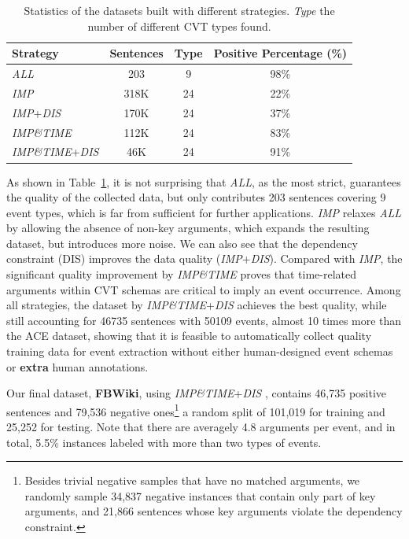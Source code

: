 \begin{table}[t!]
\scriptsize
\centering
\begin{tabular}{|l|c|c|c|} \hline
	 Strategy & Sentences & Type & Positive Percentage (\%) \\ \hline
	 \emph{ALL} & 203 & 9 & 98\% \\ \hline
	 \emph{IMP} & 318K & 24 & 22\% \\ \hline
	 \emph{IMP}+\emph{DIS} & 170K & 24 & 37\% \\ \hline
	 \emph{IMP\&TIME} & 112K & 24 & 83\% \\ \hline
	 \emph{IMP\&TIME}+\emph{DIS} & 46K & 24 & 91\% \\ \hline
\end{tabular}
\caption{Statistics of the datasets built with different strategies.
\textit{Type} the number of different CVT types found.  
\label{tab:3}}
\end{table}

As shown in Table~\ref{tab:3}, it is not surprising that \emph{ALL}, as the most strict, guarantees the quality of the collected data, but only contributes 203 sentences covering 9 event types, which is far from sufficient for further applications. \emph{IMP} relaxes \emph{ALL} by allowing the absence of non-key arguments, which expands the resulting dataset, but introduces more noise.
We can also see that the dependency constraint (DIS) improves the data quality (\emph{IMP}+\emph{DIS}).
Compared with \emph{IMP}, the significant quality improvement by \emph{IMP\&TIME} proves that time-related arguments within CVT schemas are critical to imply an event occurrence. Among all strategies, the dataset by \emph{IMP\&TIME}+\emph{DIS}  achieves the best quality, while still accounting for 46735 sentences with 50109 events, almost 10 times more than the ACE dataset, showing that it is feasible to automatically collect quality training data for event extraction without either human-designed event schemas or \textbf{extra} human annotations.

Our final dataset, \textbf{FBWiki}, using \emph{IMP\&TIME}+\emph{DIS} , contains 46,735 positive sentences and 79,536 negative ones\footnote{Besides trivial negative samples that have no matched arguments, we randomly sample 34,837 negative instances that contain only part of key arguments, and 21,866 sentences whose key arguments violate the dependency constraint.}
 a random split of 101,019 for
training and 25,252 for testing. Note that there are averagely 4.8 arguments per event, and in total, 5.5\% instances labeled with more
than two types of events.

